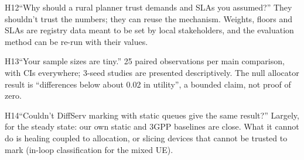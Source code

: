 \begin{qa}{H12}{``Why should a rural planner trust demands and SLAs you assumed?''}
They shouldn't trust the numbers; they can reuse the mechanism. Weights, floors and SLAs are registry data meant to be
set by local stakeholders, and the evaluation method can be re-run with their values.
\end{qa}

\begin{qa}{H13}{``Your sample sizes are tiny.''}
25 paired observations per main comparison, with CIs everywhere; 3-seed studies are presented descriptively. The null
allocator result is ``differences below about 0.02 in utility'', a bounded claim, not proof of zero.
\end{qa}

\begin{qa}{H14}{``Couldn't DiffServ marking with static queues give the same result?''}
Largely, for the steady state: our own static and 3GPP baselines are close. What it cannot do is healing coupled to
allocation, or slicing devices that cannot be trusted to mark (in-loop classification for the mixed UE).
\end{qa}
